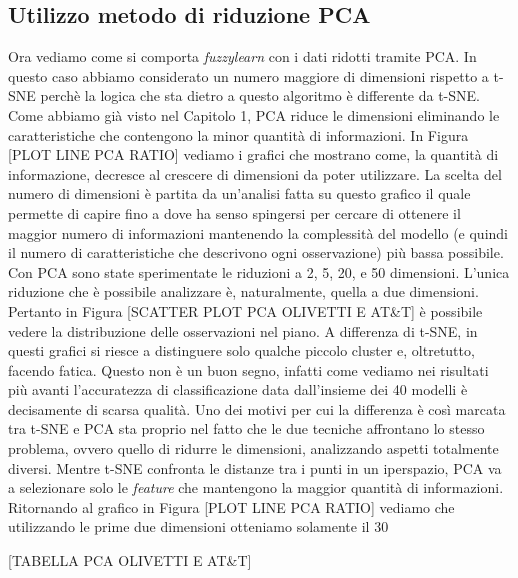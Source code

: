 \documentclass[12pt,italian]{report}
\begin{document}
\subsection{Utilizzo metodo di riduzione PCA}
Ora vediamo come si comporta \emph{fuzzylearn} con i dati ridotti tramite PCA. In questo caso abbiamo considerato un numero maggiore di dimensioni rispetto a t-SNE perchè la logica che sta dietro a questo algoritmo è differente da t-SNE. Come abbiamo già visto nel Capitolo 1, PCA riduce le dimensioni eliminando le caratteristiche che contengono la minor quantità di informazioni. In Figura [PLOT LINE PCA RATIO] vediamo i grafici che mostrano come, la quantità di informazione, decresce al crescere di dimensioni da poter utilizzare. La scelta del numero di dimensioni è partita da un'analisi fatta su questo grafico il quale permette di capire fino a dove ha senso spingersi per cercare di ottenere il maggior numero di informazioni mantenendo la complessità del modello (e quindi il numero di caratteristiche che descrivono ogni osservazione) più bassa possibile.
Con PCA sono state sperimentate le riduzioni a 2, 5, 20, e 50 dimensioni. L'unica riduzione che è possibile analizzare è, naturalmente, quella a due dimensioni. Pertanto in Figura [SCATTER PLOT PCA OLIVETTI E AT\&T] è possibile vedere la distribuzione delle osservazioni nel piano. A differenza di t-SNE, in questi grafici si riesce a distinguere solo qualche piccolo cluster e, oltretutto, facendo fatica. Questo non è un buon segno, infatti come vediamo nei risultati più avanti l'accuratezza di classificazione data dall'insieme dei 40 modelli è decisamente di scarsa qualità. Uno dei motivi per cui la differenza è così marcata tra t-SNE e PCA sta proprio nel fatto che le due tecniche affrontano lo stesso problema, ovvero quello di ridurre le dimensioni, analizzando aspetti totalmente diversi. Mentre t-SNE confronta le distanze tra i punti in un iperspazio, PCA va a selezionare solo le \emph{feature} che mantengono la maggior quantità di informazioni. Ritornando al grafico in Figura [PLOT LINE PCA RATIO] vediamo che utilizzando le prime due dimensioni otteniamo solamente il 30%

[TABELLA PCA OLIVETTI E AT\&T]
\end{document}
